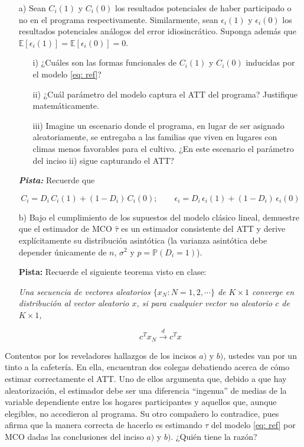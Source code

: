 \documentclass[a4paper]{article}
\begin{document}
\begin{itemize}

\item[a)] Sean $C_i(1)$ y $C_i(0)$ los resultados potenciales de haber participado o no en el programa respectivamente. Similarmente, sean $\epsilon_i(1)$ y $\epsilon_i(0)$ los resultados potenciales análogos del error idiosincrático. Suponga además que $\mathbb{E}[\epsilon_i(1)]=\mathbb{E}[\epsilon_i(0)]=0$.

\begin{itemize}
    \item[i)] ¿Cuáles son las formas funcionales de $C_i(1)$ y $C_i(0)$ inducidas por el modelo \eqref{eq: ref}?
    \item[ii)] ¿Cuál parámetro del modelo captura el ATT del programa? Justifique matemáticamente.
    
    \item[iii)] Imagine un escenario donde el programa, en lugar de ser asignado aleatoriamente, se entregaba a las familias que viven en lugares con climas menos favorables para el cultivo. ¿En este escenario el parámetro del inciso ii) sigue capturando el ATT?
\end{itemize}

\textbf{\textit{Pista:}} Recuerde que

$$C_i=D_i \, C_i(1)+ (1-D_i)\, C_i(0); \qquad \epsilon_i=D_i \, \epsilon_i(1)+ (1-D_i)\, \epsilon_i(0)$$

    
    \item[b)] Bajo el cumplimiento de los supuestos del modelo clásico lineal, demuestre que el estimador de MCO $\hat{\tau}$ es un estimador consistente del ATT y derive explícitamente su distribución asintótica (la varianza asintótica debe depender únicamente de $n$, $\sigma^2$ y $p=\mathbb{P}(D_i=1)$).
    
    \textbf{Pista:} Recuerde el siguiente teorema visto en clase:
    
    \textit{Una secuencia de vectores aleatorios $\{x_N : N=1, 2, \cdots\}$ de $K \times 1$ converge en distribución al vector aleatorio $x$, si para cualquier vector no aleatorio $c$ de $K \times 1$, }
    
    $$c^Tx_N \xrightarrow{d} c^Tx$$

    
\end{itemize}

Contentos por los reveladores hallazgos de los incisos $a)$ y $b)$, ustedes van por un tinto a la cafetería. En ella, encuentran dos colegas debatiendo acerca de cómo estimar correctamente el ATT. Uno de ellos argumenta que, debido a que hay aleatorización, el estimador debe ser una diferencia ``ingenua'' de medias de la variable dependiente entre los hogares participantes  y aquellos que, aunque elegibles, no accedieron al programa. Su otro compañero lo contradice, pues afirma que la manera correcta de hacerlo es estimando $\tau$ del modelo \eqref{eq: ref} por MCO dadas las conclusiones del inciso $a)$ y $b)$. ¿Quién tiene la razón?\\
\end{document}
